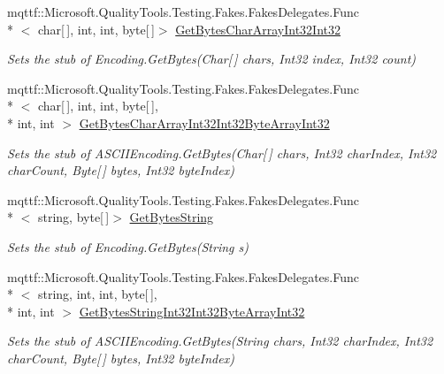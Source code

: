 \begin{DoxyCompactItemize}
mqttf\-::\-Microsoft.\-Quality\-Tools.\-Testing.\-Fakes.\-Fakes\-Delegates.\-Func\\*
$<$ char\mbox{[}$\,$\mbox{]}, int, int, byte\mbox{[}$\,$\mbox{]}$>$ \hyperlink{class_system_1_1_text_1_1_fakes_1_1_stub_a_s_c_i_i_encoding_a2c03b56709f13b0c1bd0258f5b34afc2}{Get\-Bytes\-Char\-Array\-Int32\-Int32}
\begin{DoxyCompactList}\small\item\em Sets the stub of Encoding.\-Get\-Bytes(\-Char\mbox{[}$\,$\mbox{]} chars, Int32 index, Int32 count)\end{DoxyCompactList}\item 
mqttf\-::\-Microsoft.\-Quality\-Tools.\-Testing.\-Fakes.\-Fakes\-Delegates.\-Func\\*
$<$ char\mbox{[}$\,$\mbox{]}, int, int, byte\mbox{[}$\,$\mbox{]}, \\*
int, int $>$ \hyperlink{class_system_1_1_text_1_1_fakes_1_1_stub_a_s_c_i_i_encoding_af44b112953b4e17d3139fd6a7ca643ae}{Get\-Bytes\-Char\-Array\-Int32\-Int32\-Byte\-Array\-Int32}
\begin{DoxyCompactList}\small\item\em Sets the stub of A\-S\-C\-I\-I\-Encoding.\-Get\-Bytes(\-Char\mbox{[}$\,$\mbox{]} chars, Int32 char\-Index, Int32 char\-Count, Byte\mbox{[}$\,$\mbox{]} bytes, Int32 byte\-Index)\end{DoxyCompactList}\item 
mqttf\-::\-Microsoft.\-Quality\-Tools.\-Testing.\-Fakes.\-Fakes\-Delegates.\-Func\\*
$<$ string, byte\mbox{[}$\,$\mbox{]}$>$ \hyperlink{class_system_1_1_text_1_1_fakes_1_1_stub_a_s_c_i_i_encoding_a13d2094a6ff0a74076c54e741b711c6b}{Get\-Bytes\-String}
\begin{DoxyCompactList}\small\item\em Sets the stub of Encoding.\-Get\-Bytes(\-String s)\end{DoxyCompactList}\item 
mqttf\-::\-Microsoft.\-Quality\-Tools.\-Testing.\-Fakes.\-Fakes\-Delegates.\-Func\\*
$<$ string, int, int, byte\mbox{[}$\,$\mbox{]}, \\*
int, int $>$ \hyperlink{class_system_1_1_text_1_1_fakes_1_1_stub_a_s_c_i_i_encoding_aa3f7325074cc98a0c8a954b559a4bba7}{Get\-Bytes\-String\-Int32\-Int32\-Byte\-Array\-Int32}
\begin{DoxyCompactList}\small\item\em Sets the stub of A\-S\-C\-I\-I\-Encoding.\-Get\-Bytes(\-String chars, Int32 char\-Index, Int32 char\-Count, Byte\mbox{[}$\,$\mbox{]} bytes, Int32 byte\-Index)\end{DoxyCompactList}\item 

\end{DoxyCompactItemize}
